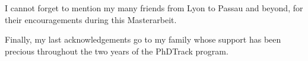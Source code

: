 \documentclass[11pt]{book} %
\begin{document}
I cannot forget to mention my many friends from Lyon to Passau and beyond, for their encouragements during this Masterarbeit.

Finally, my last acknowledgements go to my family whose support has been precious throughout the two years of the PhDTrack program.

\newpage
\tableofcontents
\listoffigures
\listoftables
\lstlistoflistings
\newpage




%





\newpage
\begin{appendices}
    
\end{appendices}

\newpage
\printglossary[type=\acronymtype]

\printglossary

\newpage
\printbibliography[
    heading=bibintoc,
    category=cited,
    title={References}
]

\printbibliography[
    notcategory=cited,
    heading=bibintoc,
    title={Additional bibliography},
]



\restoregeometry
\end{document}

